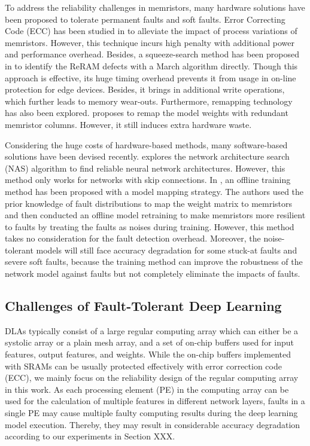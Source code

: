 To address the reliability challenges in memristors, many hardware solutions have been proposed to tolerate permanent faults and soft faults. Error Correcting Code (ECC) has been studied in \cite{6165062} to alleviate the impact of process variations of memristors. However, this technique incurs high penalty with additional power and performance overhead. Besides, a squeeze-search method has been proposed in  \cite{6725492} to identify the ReRAM defects with a March algorithm directly. Though this approach is effective, its huge timing overhead prevents it from usage in on-line protection for edge devices. Besides, it brings in additional write operations, which further leads to memory wear-outs. Furthermore, remapping technology has also been explored. \cite{8119491} proposes to remap the model weights with redundant memristor columns. However, it still induces extra hardware waste.
                
Considering the huge costs of hardware-based methods, many software-based solutions have been devised recently. \cite{9045324} explores the network architecture search (NAS) algorithm to find reliable neural network architectures. However, this method only works for networks with skip connections. In \cite{7926952}, an offline training method has been proposed with a model mapping strategy. The authors used the prior knowledge of fault distributions to map the weight matrix to memristors and then conducted an offline model retraining to make memristors more resilient to faults by treating the faults as noises during training.  However, this method takes no consideration for the fault detection overhead. Moreover, the noise-tolerant models will still face accuracy degradation for some stuck-at faults and severe soft faults, because the training method can improve the robustness of the network model against faults but not completely eliminate the impacts of faults. 


\subsection{Challenges of Fault-Tolerant Deep Learning}
DLAs typically consist of a large regular computing array which can either be a systolic array or a plain mesh array\cite{jouppi2017datacenter, Chen2016Eyeriss}, and a set of on-chip buffers used for input features, output features, and weights. While the on-chip buffers implemented with SRAMs can be usually protected effectively with error correction code (ECC), we mainly focus on the reliability design of the regular computing array in this work. As each processing element (PE) in the computing array can be used for the calculation of multiple features in different network layers, faults in a single PE may cause multiple faulty computing results during the deep learning model execution. Thereby, they may result in considerable accuracy degradation according to our experiments in Section XXX. 

